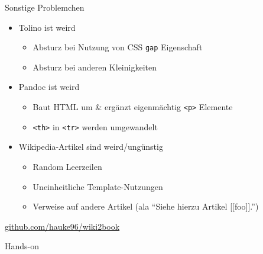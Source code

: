 \documentclass[9pt]{beamer}
\begin{document}
	\begin{frame}{Sonstige Problemchen}
		\begin{itemize}
			\item Tolino ist weird
			\begin{itemize}
				\item Absturz bei Nutzung von CSS \texttt{gap} Eigenschaft
				\item Absturz bei anderen Kleinigkeiten
			\end{itemize}\pause
			\item Pandoc ist weird
			\begin{itemize}
				\item Baut HTML um \& ergänzt eigenmächtig \texttt{<p>} Elemente
				\item \texttt{<th>} in \texttt{<tr>} werden umgewandelt
			\end{itemize}\pause
			\item Wikipedia-Artikel sind weird/ungünstig
			\begin{itemize}
				\item Random Leerzeilen
				\item Uneinheitliche Template-Nutzungen
				\item Verweise auf andere Artikel (ala "`Siehe hierzu Artikel [[foo]]."')
			\end{itemize}
		\end{itemize}
	\end{frame}
	
	\begin{frame}
		\vspace{1cm}
		\centering\href{https://github.com/hauke96/wiki2book}{github.com/hauke96/wiki2book}
	\end{frame}
	
	\begin{frame}
		\vspace{1cm}
		\centering Hands-on
	\end{frame}
\end{document}
